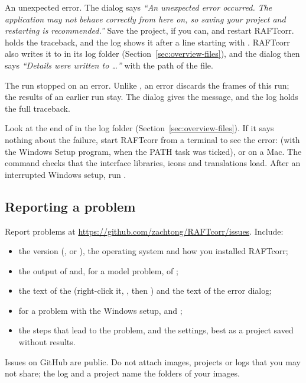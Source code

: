 \begin{description}[leftmargin=0.6cm,style=nextline]
  \item[``RAFTcorr has hit an error'']
    An unexpected error. The dialog says \emph{``An unexpected error occurred. The application may
    not behave correctly from here on, so saving your project and restarting is recommended.''}
    Save the project, if you can, and restart RAFTcorr.  holds the traceback,
    and the log shows it after a line starting with . RAFTcorr also writes it to
     in its log folder (Section~\ref{sec:overview-files}), and the dialog
    then says \emph{``Details were written to \ldots''} with the path of the file.
  \item[``Analysis failed'' with another message]
    The run stopped on an error. Unlike , an error discards the frames of this run;
    the results of an earlier run stay. The dialog gives the message, and the log holds the full
    traceback.
  \item[RAFTcorr does not start, or closes at once]
    Look at the end of  in the log folder (Section~\ref{sec:overview-files}).
    If it says nothing about the failure, start RAFTcorr from a terminal to see the error:
     (with the Windows Setup program, when the PATH task was ticked), or
    \allowbreak{} on a Mac. The command
     checks that the interface libraries, icons and translations
    load. After an interrupted Windows setup, run .
\end{description}

\subsection{Reporting a problem}
\label{sec:troubleshooting-report}

Report problems at \url{https://github.com/zachtong/RAFTcorr/issues}. Include:

\begin{itemize}
  \item the version (, or ), the operating
    system and how you installed RAFTcorr;
  \item the output of  and, for a model problem, of ;
  \item the text of the  (right-click it, , then ) and the
     text of the error dialog;
  \item {} for a problem with the Windows setup, and ;
  \item the steps that lead to the problem, and the settings, best as a project saved without
    results.
\end{itemize}

\begin{warnbox}
Issues on GitHub are public. Do not attach images, projects or logs that you may not share; the
log and a project name the folders of your images.
\end{warnbox}
